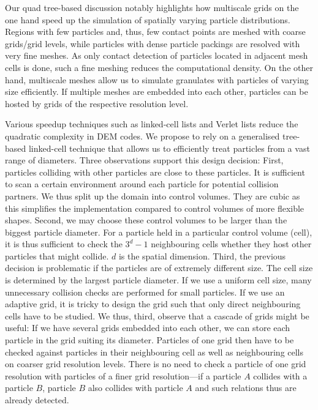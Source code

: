 \documentclass[times,12pt]{article}
\begin{document}
Our quad tree-based discussion notably
highlights how multiscale grids on the one hand speed up the simulation
of spatially varying particle distributions. Regions with few particles
and, thus, few contact points are meshed with coarse grids/grid levels,
while particles with dense particle packings are resolved with very fine
meshes. As only contact detection of particles located in adjacent mesh
cells is done, such a fine meshing reduces the computational density. On
the other hand, multiscale meshes allow us to simulate granulates with
particles of varying size efficiently. If multiple meshes are embedded
into each other, particles can be hosted by grids of the respective
resolution level.

Various speedup techniques such as linked-cell lists \cite{Eckhardt2014} and Verlet lists
\cite{Fleissner, Eckhardt2014} reduce the quadratic complexity in DEM codes.
We propose to rely on a generalised tree-based linked-cell
technique that allows us to efficiently treat particles from a vast range of diameters.
Three observations support this design decision:
First, particles colliding with other particles are close to these particles.
It is sufficient to scan a certain environment around each particle for
potential collision partners.
We thus split up the domain into control volumes.
They are cubic as this simplifies the implementation compared to control volumes
of more flexible shapes.
Second, we may choose these control volumes to be larger than the biggest
particle diameter. 
For a particle held in a particular control volume (cell), it is thus sufficient
to check the $3^d-1$ neighbouring cells whether they host other particles that
might collide. 
$d$ is the spatial dimension.
Third, the previous decision is problematic if the particles are of extremely
different size. 
The cell size is determined by the largest particle diameter. 
If we use a uniform cell size, many unnecessary collision checks are performed
for small particles.
If we use an adaptive grid, it is tricky to design the grid such that only
direct neighbouring cells have to be studied.
We thus, third, observe that a cascade of grids might be useful: If we have
several grids embedded into each other, we can store each particle in the grid
suiting its diameter.
Particles of one grid then have to be checked against particles in their
neighbouring cell as well as neighbouring cells on coarser grid resolution
levels.
There is no need to check a particle of one grid resolution with particles of a
finer grid resolution---if a particle $A$ collides with a particle $B$, particle
$B$ also collides with particle $A$ and such relations thus are already
detected.
\end{document}
